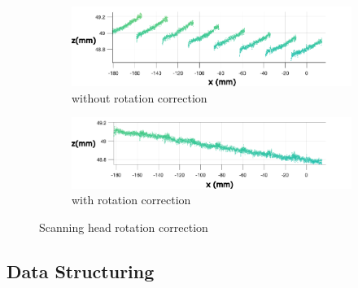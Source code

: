\documentclass[12pt]{report}
\begin{document}
\begin{figure}[h!]
    \begin{subfigure}{\textwidth}
        \centering
        \includegraphics[width=0.8\linewidth]{figures/profile_measure/uncalib_line.pdf}  
        \caption{without rotation correction}
        \label{fig:uncalib_line}
    \end{subfigure}
    \newline
    \begin{subfigure}{\textwidth}
        \centering
        \includegraphics[width=0.8\linewidth]{figures/profile_measure/calib_line.pdf}  
        \caption{with rotation correction}
        \label{fig:calib_line}
    \end{subfigure}
    \caption{Scanning head rotation correction}
    \label{fig:rot_correction}
\end{figure}
\pagebreak
\subsection{Data Structuring}

\end{document}

